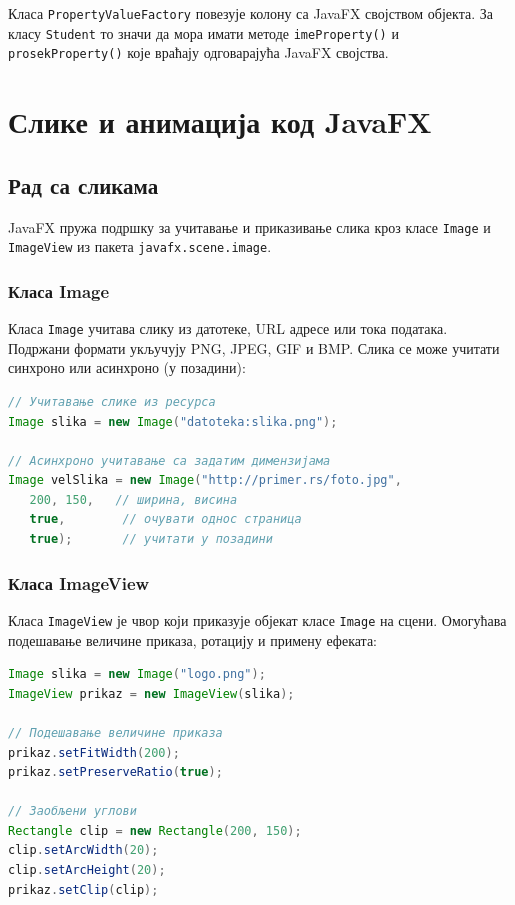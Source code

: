 Класа \texttt{PropertyValueFactory} повезује колону са JavaFX својством објекта. За класу \texttt{Student} то значи да мора имати методе \texttt{imeProperty()} и \texttt{prosekProperty()} које враћају одговарајућа JavaFX својства.


\section{Слике и анимација код JavaFX}

\subsection{Рад са сликама}

JavaFX пружа подршку за учитавање и приказивање слика кроз класе \texttt{Image} и \texttt{ImageView} из пакета \texttt{javafx.scene.image}.

\subsubsection{Класа Image}

Класа \texttt{Image} учитава слику из датотеке, URL адресе или тока података. Подржани формати укључују PNG, JPEG, GIF и BMP. Слика се може учитати синхроно или асинхроно (у позадини):


\begin{lstlisting}[language=Java]
// Учитавање слике из ресурса
Image slika = new Image("datoteka:slika.png");
 
// Асинхроно учитавање са задатим димензијама
Image velSlika = new Image("http://primer.rs/foto.jpg",
   200, 150,   // ширина, висина
   true,        // очувати однос страница
   true);       // учитати у позадини
\end{lstlisting}


\subsubsection{Класа ImageView}

Класа \texttt{ImageView} је чвор који приказује објекат класе \texttt{Image} на сцени. Омогућава подешавање величине приказа, ротацију и примену ефеката:


\begin{lstlisting}[language=Java]
Image slika = new Image("logo.png");
ImageView prikaz = new ImageView(slika);
 
// Подешавање величине приказа
prikaz.setFitWidth(200);
prikaz.setPreserveRatio(true);
 
// Заобљени углови
Rectangle clip = new Rectangle(200, 150);
clip.setArcWidth(20);
clip.setArcHeight(20);
prikaz.setClip(clip);
\end{lstlisting}



